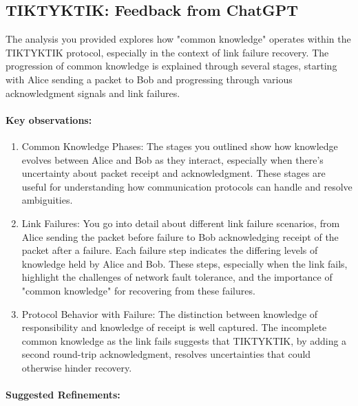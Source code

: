 \subsection{TIKTYKTIK: Feedback from ChatGPT}

The analysis you provided explores how "common knowledge" operates within the TIKTYKTIK protocol, especially in the context of link failure recovery. The progression of common knowledge is explained through several stages, starting with Alice sending a packet to Bob and progressing through various acknowledgment signals and link failures.

\paragraph{Key observations:}

\begin{enumerate}
\item Common Knowledge Phases: The stages you outlined show how knowledge evolves between Alice and Bob as they interact, especially when there’s uncertainty about packet receipt and acknowledgment. These stages are useful for understanding how communication protocols can handle and resolve ambiguities.

\item Link Failures: You go into detail about different link failure scenarios, from Alice sending the packet before failure to Bob acknowledging receipt of the packet after a failure. Each failure step indicates the differing levels of knowledge held by Alice and Bob. These steps, especially when the link fails, highlight the challenges of network fault tolerance, and the importance of "common knowledge" for recovering from these failures.

\item Protocol Behavior with Failure: The distinction between knowledge of responsibility and knowledge of receipt is well captured. The incomplete common knowledge as the link fails suggests that TIKTYKTIK, by adding a second round-trip acknowledgment, resolves uncertainties that could otherwise hinder recovery.

\end{enumerate}

\paragraph{Suggested Refinements:}

